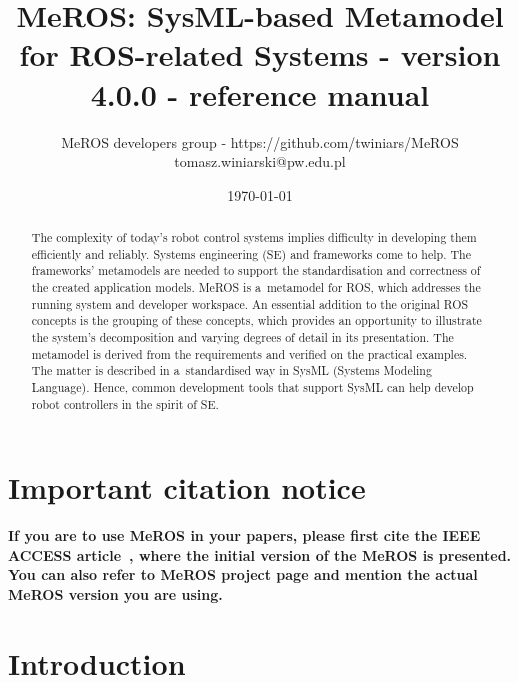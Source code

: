 \documentclass[11pt,oneside,a4paper]{report}
\begin{document}
	
\title{MeROS: SysML-based Metamodel for ROS-related Systems - version 4.0.0 - reference manual}
\author{MeROS developers group - https://github.com/twiniars/MeROS \\ tomasz.winiarski@pw.edu.pl}
\date{\today}
\maketitle


\begin{abstract}
	The complexity of today's robot control systems implies difficulty in developing them efficiently and reliably. Systems engineering (SE) and frameworks come to help. The frameworks' metamodels are needed to support the standardisation and correctness of the created application models. MeROS is a~metamodel for ROS, which addresses the running system and developer workspace. An essential addition to the original ROS concepts is the grouping of these concepts, which provides an opportunity to illustrate the system's decomposition and varying degrees of detail in its presentation. The metamodel is derived from the requirements and verified on the practical examples. The matter is described in a~standardised way in SysML (Systems Modeling Language). Hence, common development tools that support SysML can help develop robot controllers in the spirit of SE.
\end{abstract}
	
	
	
	\maketitle
	
\chapter*{Important citation notice}

\textbf{If you are to use MeROS in your papers, please first cite the IEEE ACCESS  article~\cite{meros-access}, where the initial version of the MeROS is presented. You can also refer to MeROS project page \cite{meros-www} and mention the actual MeROS version you are using.}
	
	
\chapter{Introduction}
\label{ch:intro}	
\end{document}
